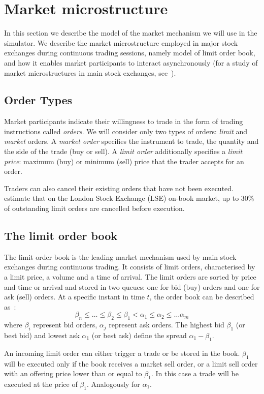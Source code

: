 \section{Market microstructure}
\label{Chapters/Background/Market-Microstructure}

In this section we describe the model of the market mechanism we will use in the simulator. We describe the market microstructure employed in major stock exchanges during continuous trading sessions, namely model of limit order book, and how it enables market participants to interact asynchronously (for a study of market microstructures in main stock exchanges, see~\cite{Comerton2004}). 

\subsection{Order Types}
Market participants indicate their willingness to trade in the form of trading instructions called \textit{orders}. We will consider only two types of orders: \textit{limit} and \textit{market} orders. A \textit{market order} specifies the instrument to trade, the quantity and the side of the trade (buy or sell). A \textit{limit order} additionally specifies a \textit{limit price}: maximum (buy) or minimum (sell) price that the trader accepts for an order. 

Traders can also cancel their existing orders that have not been executed. \citet{Lilo2004} estimate that on the London Stock Exchange (LSE) on-book market, up to 30\% of outstanding limit orders are cancelled before execution.

\subsection{The limit order book}
The limit order book is the leading market mechanism used by main stock exchanges during continuous trading. It consists of limit orders, characterised by a limit price, a volume and a time of arrival. The limit orders are sorted by price and time or arrival and stored in two queues: one for bid (buy) orders and one for ask (sell) orders. At a specific instant in time $t$, the order book can be described as~\cite{Gilles2006}: 
\begin{equation*}
\beta_n \leq \ldots \leq \beta_2 \leq \beta_1 < \alpha_1 \leq \alpha_2 \leq \ldots \alpha_m
\end{equation*}
where $\beta_i$ represent bid orders, $\alpha_j$ represent ask orders. The highest bid $\beta_1$ (or best bid) and lowest ask $\alpha_1$ (or best ask) define the spread $\alpha_1 - \beta_1$.

An incoming limit order can either trigger a trade or be stored in the book.    $\beta_1$ will be executed only if the book receives a market sell order, or a limit sell order with an offering price lower than or equal to $\beta_1$. In this case a trade will be executed at the price of $\beta_1$. Analogously for $\alpha_1$.







